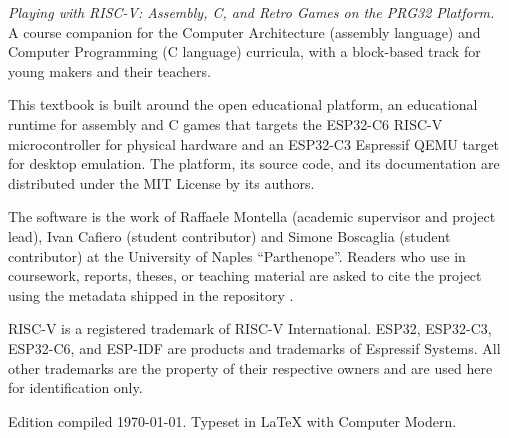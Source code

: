 \thispagestyle{empty}
\vspace*{\fill}
\noindent
{\small
\textit{Playing with RISC-V: Assembly, C, and Retro Games on the PRG32 Platform.}\\
A course companion for the Computer Architecture (assembly language)
and Computer Programming (C language) curricula, with a block-based track for
young makers and their teachers.\par
\vspace{1em}

\noindent
This textbook is built around the \prg open educational platform, an
educational runtime for \riscv assembly and C games that targets the
ESP32\nobreakdash-C6 RISC\nobreakdash-V microcontroller for physical hardware
and an ESP32\nobreakdash-C3 Espressif QEMU target for desktop emulation. The
platform, its source code, and its documentation are distributed under the MIT
License by its authors.\par
\vspace{1em}

\noindent
The \prg software is the work of Raffaele Montella (academic supervisor and
project lead), Ivan Cafiero (student contributor) and Simone Boscaglia (student contributor) 
at the University of Naples ``Parthenope''. Readers who use \prg in coursework, reports, 
theses, or teaching material are asked to cite the project using the  
metadata shipped in the repository \citep{prg32repo}.\par
\vspace{1em}

\noindent
RISC\nobreakdash-V is a registered trademark of RISC\nobreakdash-V
International. ESP32, ESP32\nobreakdash-C3, ESP32\nobreakdash-C6, and ESP\nobreakdash-IDF are
products and trademarks of Espressif Systems. All other trademarks are the
property of their respective owners and are used here for identification only.\par
\vspace{1em}

\noindent
Edition compiled \today. Typeset in \LaTeX{} with Computer Modern.\par
}
\vspace*{\fill}
\clearpage
